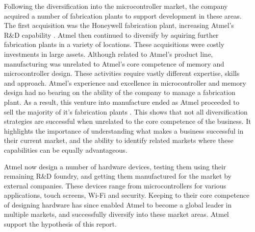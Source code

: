 Following the diversification into the microcontroller market, the company acquired a number of fabrication plants to support development in these areas.
The first acquisition was the Honeywell fabrication plant, increasing Atmel's R\&D capability \cite{atmel:acq1}.
Atmel then continued to diversify by aquiring further fabrication plants in a variety of locations.
These acquisitions were costly investments in large assets.
Although related to Atmel's product line, manufacturing was unrelated to Atmel's core competence of memory and microcontroller design.
These activities require vastly different expertise, skills and approach.
Atmel's experience and excellence in microcontroller and memory design had no bearing on the ability of the company to manage a fabrication plant.
As a result, this venture into manufacture ended as Atmel proceeded to sell the majority of it's fabrication plants \cite{atmel:acq:nantes05, atmel:acq:grenoble06, atmel:acq:tyneside07, atmel:acq:heilbronn08}.
This shows that not all diversification strategies are successful when unrelated to the core competence of the business.
It highlights the importance of understanding what makes a business successful in their current market, and the ability to identify related markets where these capabilities can be equally advantageous.

Atmel now design a number of hardware devices, testing them using their remaining R\&D foundry, and getting them manufactured for the market by external companies.
These devices range from microcontrollers for various applications, touch screens, Wi-Fi and security.
Keeping to their core competence of designing hardware has since enabled Atmel to become a global leader in multiple markets, and successfully diversify into these market areas. 
Atmel support the hypothesis of this report.

